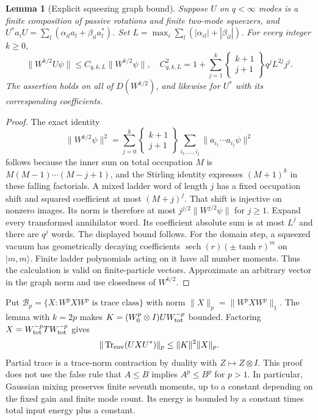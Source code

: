 \documentclass[11pt]{article}
\newcommand{\Tr}{\operatorname{Tr}}
\newtheorem{lemma}[theorem]{Lemma}
\theoremstyle{remark}\newtheorem{remark}[theorem]{Remark}
\begin{document}
\begin{lemma}[Explicit squeezing graph bound]\label{lem:graph}
Suppose $U$ on $q<\infty$ modes is a finite composition of passive
rotations and finite two-mode squeezers, and
$U^*a_iU=\sum_l(\alpha_{il}a_l+\beta_{il}a_l^*)$.
Set $L=\max_i\sum_l(|\alpha_{il}|+|\beta_{il}|)$.
For every integer $k\ge0$,
\[
 \|W^{k/2}U\psi\|\le C_{q,k,L}\|W^{k/2}\psi\|,
\quad
 C_{q,k,L}^2=1+\sum_{j=1}^k
 \left\{\begin{matrix}k+1\\j+1\end{matrix}\right\}q^j L^{2j}j^j.
\]
The assertion holds on all of $D(W^{k/2})$, and likewise for $U^*$
with its corresponding coefficients.
\end{lemma}
\begin{proof}
The exact identity
\[
 \|W^{k/2}\psi\|^2=
 \sum_{j=0}^k\left\{\begin{matrix}k+1\\j+1\end{matrix}\right\}
 \sum_{i_1,\ldots,i_j}\|a_{i_1}\cdots a_{i_j}\psi\|^2
\]
follows because the inner sum on total occupation $M$ is
$M(M-1)\cdots(M-j+1)$, and the Stirling identity expresses $(M+1)^k$
in these falling factorials. A mixed ladder word of length $j$ has a
fixed occupation shift and squared coefficient at most $(M+j)^j$.
That shift is injective on nonzero images. Its norm is therefore at most
$j^{j/2}\|W^{j/2}\psi\|$ for $j\ge1$.
Expand every transformed annihilator word. Its coefficient absolute sum
is at most $L^j$ and there are $q^j$ words. The displayed bound follows.
For the domain step, a squeezed vacuum has geometrically decaying
coefficients $\operatorname{sech}(r)(\pm\tanh r)^m$ on $|m,m\rangle$.
Finite ladder polynomials acting on it have all number moments.
Thus the calculation is valid on finite-particle vectors. Approximate an
arbitrary vector in the graph norm and use closedness of $W^{k/2}$.
\end{proof}

Put $\mathcal B_p=\{X:W^pXW^p\text{ is trace class}\}$ with norm
$\|X\|_p=\|W^pXW^p\|_1$. The lemma with $k=2p$ makes
$K=(W_0^p\otimes I)UW_{\rm tot}^{-p}$ bounded.
Factoring $X=W_{\rm tot}^{-p}TW_{\rm tot}^{-p}$ gives
\begin{equation}\label{eq:weighted-channel}
 \|\Tr_{\rm env}(UXU^*)\|_p\le\|K\|^2\|X\|_p.
\end{equation}
Partial trace is a trace-norm contraction by duality with
$Z\mapsto Z\otimes I$. This proof does not use the false rule that
$A\le B$ implies $A^p\le B^p$ for $p>1$.
In particular, Gaussian mixing preserves finite seventh moments, up to
a constant depending on the fixed gain and finite mode count. Its energy
is bounded by a constant times total input energy plus a constant.
\end{document}
